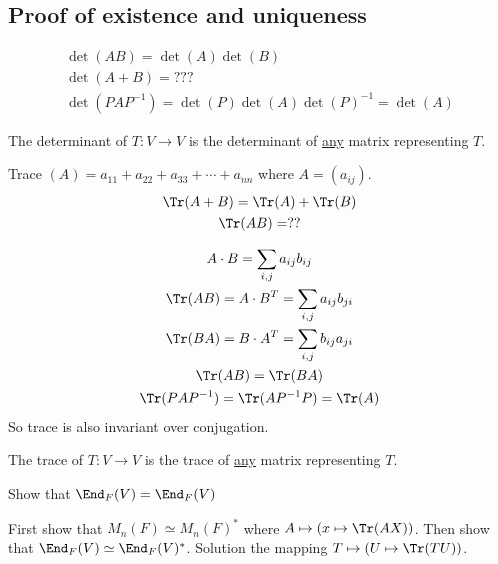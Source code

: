 \documentclass[class=scrartcl, crop=false]{standalone}
\begin{document}
\subsection{Proof of existence and uniqueness}

\begin{gather*}
  \det(AB) = \det(A)\det(B) \\
  \det(A + B) = ??? \\
  \det(PAP^{-1}) = \det(P)\det(A)\det(P)^{-1} = \det(A)
\end{gather*} 

\begin{definition}
  The determinant of $T: V \to V$ is the determinant of \ul{any} matrix representing $T$.
\end{definition} 

\begin{definition}[Trace]
  Trace $(A) = a_{11} + a_{22} + a_{33} + \cdots + a_{nn}$ where $A = (a_{ij})$. \\
  \begin{gather*}
    \Tr(A + B) = \Tr(A) + \Tr(B) \\
    \Tr(AB) = ??
  \end{gather*} 
\end{definition} 

\begin{lemma}
  \begin{gather*}
    A \cdot B = \sum_{i, j} a_{ij}b_{ij} \\
    \Tr(AB) = A \cdot B^T = \sum_{i, j}a_{ij}b_{ji} \\
    \Tr(BA) = B \cdot A^T = \sum_{i, j}b_{ij}a_{ji} \\
    \Tr(AB) = \Tr(BA) \\
    \Tr(P A P^{-1}) = \Tr(A P^{-1} P) = \Tr(A)
  \end{gather*} 
  So trace is also invariant over conjugation.
\end{lemma} 

\begin{definition}
  The trace of $T: V \to V$ is the trace of \ul{any} matrix representing $T$.
\end{definition} 

\begin{exercise}
  Show that $\End_F(V) = \End_F(V)$ \\
  \begin{enumerate}
    \ii
    First show that $M_n(F) \simeq M_n(F)^*$ where $A \mapsto (x \mapsto \Tr(AX))$.
    \ii
    Then show that $\End_F(V) \simeq \End_F(V)^*$. Solution the mapping $T \mapsto (U \mapsto \Tr(TU))$.
  \end{enumerate} 
\end{exercise} 
\end{document}
